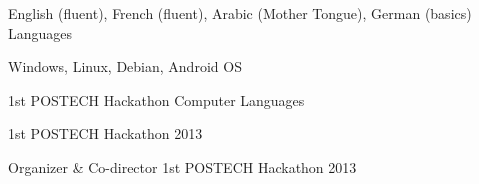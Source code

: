 

\begin{cvhonors}

  \cvhonor
    {} %
    {\hspace{1mm} English (fluent), French  (fluent), Arabic (Mother Tongue), German (basics) } %
    {} %
    {Languages} %

  \cvhonor
    {} %
    {\hspace{1mm}Windows, Linux, Debian, Android} %
    {} %
    {OS} %


\cvhonor
    {} %
    {\hspace{1mm}1st POSTECH Hackathon} %
    {} %
    {Computer Languages} %

\cvhonor
    {} %
    {\hspace{1mm}1st POSTECH Hackathon} %
    {} %
    {2013} %

\cvhonor
    {Organizer \& Co-director} %
    {\hspace{1mm} 1st POSTECH Hackathon} %
    {} %
    {2013} %




\end{cvhonors}
